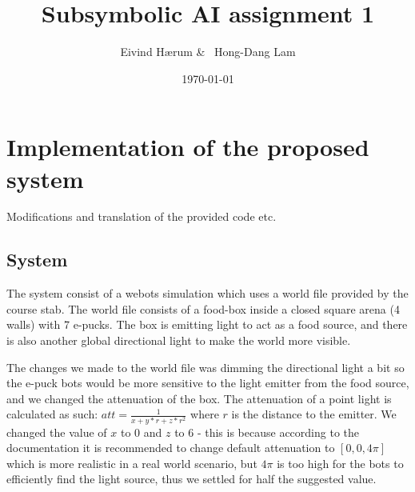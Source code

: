 \documentclass[12pt, a4paper]{article}
\title{Subsymbolic AI assignment 1}
\author{Eivind Hærum \& \ Hong-Dang Lam}
\date{\today} %
\begin{document}
\maketitle
% 
% 
 
\newpage
\tableofcontents
\newpage

\section{Implementation of the proposed system}
Modifications and translation of the provided code etc.

\subsection{System}
The system consist of a webots simulation which uses a world file provided by the course stab. The world file consists of a food-box inside a closed square arena (4 walls) with 7 e-pucks. The box is emitting light to act as a food source, and there is also another global directional light to make the world more visible.

The changes we made to the world file was dimming the directional light a bit so the e-puck bots would be more sensitive to the light emitter from the food source, and we changed the attenuation of the box. The attenuation of a point light is calculated as such: $ att = \frac{1}{x+y*r+z*r^2} $ where $r$ is the distance to the emitter. We changed the value of $x$ to 0 and $z$ to 6 - this is because according to the documentation it is recommended to change default attenuation to $[0,0,4\pi]$ which is more realistic in a real world scenario, but $4\pi$ is too high for the bots to efficiently find the light source, thus we settled for half the suggested value.  
\end{document}

